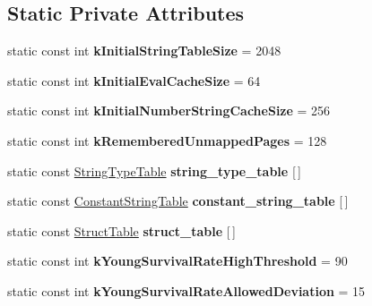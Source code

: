 \subsection*{Static Private Attributes}
\begin{DoxyCompactItemize}
\item 
static const int {\bfseries k\+Initial\+String\+Table\+Size} = 2048\hypertarget{classv8_1_1internal_1_1_heap_a23dab6577f71556e4d4ef93c3f758cba}{}\label{classv8_1_1internal_1_1_heap_a23dab6577f71556e4d4ef93c3f758cba}

\item 
static const int {\bfseries k\+Initial\+Eval\+Cache\+Size} = 64\hypertarget{classv8_1_1internal_1_1_heap_a822a013fd1f7828f6d3c35cae7bd465b}{}\label{classv8_1_1internal_1_1_heap_a822a013fd1f7828f6d3c35cae7bd465b}

\item 
static const int {\bfseries k\+Initial\+Number\+String\+Cache\+Size} = 256\hypertarget{classv8_1_1internal_1_1_heap_a4ee60bb3f9077123eb7552cbe0049f9d}{}\label{classv8_1_1internal_1_1_heap_a4ee60bb3f9077123eb7552cbe0049f9d}

\item 
static const int {\bfseries k\+Remembered\+Unmapped\+Pages} = 128\hypertarget{classv8_1_1internal_1_1_heap_a38e01ccc0035ff2ca7a615abc9b5e466}{}\label{classv8_1_1internal_1_1_heap_a38e01ccc0035ff2ca7a615abc9b5e466}

\item 
static const \hyperlink{structv8_1_1internal_1_1_heap_1_1_string_type_table}{String\+Type\+Table} {\bfseries string\+\_\+type\+\_\+table} \mbox{[}$\,$\mbox{]}
\item 
static const \hyperlink{structv8_1_1internal_1_1_heap_1_1_constant_string_table}{Constant\+String\+Table} {\bfseries constant\+\_\+string\+\_\+table} \mbox{[}$\,$\mbox{]}
\item 
static const \hyperlink{structv8_1_1internal_1_1_heap_1_1_struct_table}{Struct\+Table} {\bfseries struct\+\_\+table} \mbox{[}$\,$\mbox{]}
\item 
static const int {\bfseries k\+Young\+Survival\+Rate\+High\+Threshold} = 90\hypertarget{classv8_1_1internal_1_1_heap_a9d144b543ef9bfeb98c645bcccfa2e6f}{}\label{classv8_1_1internal_1_1_heap_a9d144b543ef9bfeb98c645bcccfa2e6f}

\item 
static const int {\bfseries k\+Young\+Survival\+Rate\+Allowed\+Deviation} = 15\hypertarget{classv8_1_1internal_1_1_heap_a5805f32a9b91665b58cd177b1848b17a}{}\label{classv8_1_1internal_1_1_heap_a5805f32a9b91665b58cd177b1848b17a}


\end{DoxyCompactItemize}
